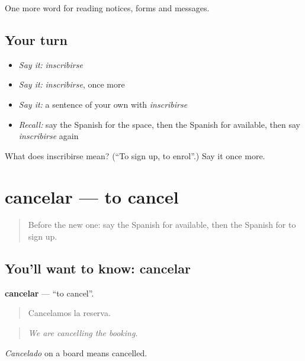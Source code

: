 \begin{grammarlens}[title={What you've built}]
One more word for reading notices, forms and messages.
\end{grammarlens}

\subsection*{Your turn}
\begin{itemize}
\raggedright
  \item \emph{Say it:} \emph{inscribirse}
  \item \emph{Say it:} \emph{inscribirse}, once more
  \item \emph{Say it:} a sentence of your own with \emph{inscribirse}
  \item \emph{Recall:} say the Spanish for the space, then the Spanish for available, then say \emph{inscribirse} again
\end{itemize}

\begin{tcolorbox}[breakable,colback=teal!4,colframe=teal!35!black,title={Before you move on}]
What does inscribirse mean? (\textquotedblleft{}To sign up, to enrol\textquotedblright{}.) Say it once more.
\end{tcolorbox}
\section[cancelar]{cancelar — to cancel}

\label{lesson:ES-C479-cancelar}



\begin{quote}
Before the new one: say the Spanish for available, then the Spanish for to sign up.
\end{quote}

\subsection*{You'll want to know: cancelar}
\textbf{cancelar} — \textquotedblleft{}to cancel\textquotedblright{}.

\begin{quote}
Cancelamos la reserva.
\end{quote}

\begin{quote}
\emph{We are cancelling the booking.}
\end{quote}

\emph{Cancelado} on a board means cancelled.

